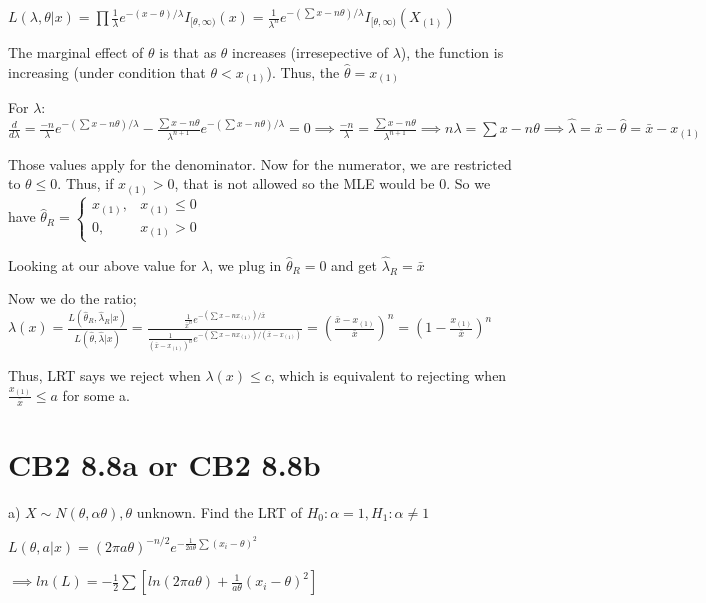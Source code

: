 \documentclass{article}
\let\Oldsum=\sum
\let\Oldprod=\prod
\renewcommand{\sum}{\Oldsum\limits}
\renewcommand{\prod}{\Oldprod\limits}
\begin{document}
$L(\lambda, \theta | x) = \prod \frac{1}{\lambda}e^{-(x-\theta)/\lambda}I_{[\theta, \infty)}(x) = \frac{1}{\lambda^n}e^{-(\sum x - n\theta)/\lambda} I_{[\theta, \infty)}(X_{(1)})$

The marginal effect of $\theta$ is that as $\theta$ increases (irresepective of $\lambda$), the function is increasing (under condition that $\theta < x_{(1)}$). Thus, the $\hat{\theta} = x_{(1)}$

For $\lambda$: $\frac{d}{d\lambda} = \frac{-n}{\lambda}e^{-(\sum x - n\theta)/\lambda} - \frac{\sum x - n\theta}{\lambda^{n+1}}e^{-(\sum x - n\theta)/\lambda} = 0 \implies \frac{-n}{\lambda} = \frac{\sum x - n\theta}{\lambda^{n+1}} \implies n\lambda = \sum x - n\theta \implies \hat{\lambda} = \bar{x} - \hat{\theta} = \bar{x} - x_{(1)}$

Those values apply for the denominator. Now for the numerator, we are restricted to $\theta \le 0$. Thus, if $x_{(1)} > 0$, that is not allowed so the MLE would be $0$. So we have $\hat{\theta}_R = \begin{cases} x_{(1)}, & x_{(1)} \le 0 \\ 0, & x_{(1)} > 0 \end{cases}$

Looking at our above value for $\lambda$, we plug in $\hat{\theta}_R = 0$ and get $\hat{\lambda}_R = \bar{x}$

Now we do the ratio; $\lambda(x) = \frac{L(\hat{\theta}_R, \hat{\lambda}_R|x)}{L(\hat{\theta}, \hat{\lambda}|x)} = \frac{\frac{1}{\bar{x}^n}e^{-(\sum x - n x_{(1)})/\bar{x}}}{\frac{1}{(\bar{x} - x_{(1)})^n} e^{-(\sum x - n x_{(1)})/(\bar{x} - x_{(1)})}} = (\frac{\bar{x} - x_{(1)}}{\bar{x}})^n = (1 - \frac{x_{(1)}}{\bar{x}})^n$

Thus, LRT says we reject when $\lambda(x) \le c$, which is equivalent to rejecting when $\frac{x_{(1)}}{\bar{x}} \le a$ for some a. 

\section{CB2 8.8a or CB2 8.8b}

a) $X \sim N(\theta, \alpha \theta), \theta$ unknown. Find the LRT of $H_0: \alpha = 1, H_1: \alpha \neq 1$

$L(\theta, a |x) = (2\pi a\theta)^{-n/2}e^{-\frac{1}{2a\theta}\sum (x_i - \theta)^2}$

$\implies ln(L) = -\frac{1}{2}\sum [ln(2\pi a\theta) + \frac{1}{a\theta}(x_i-\theta)^2]$
\end{document}
